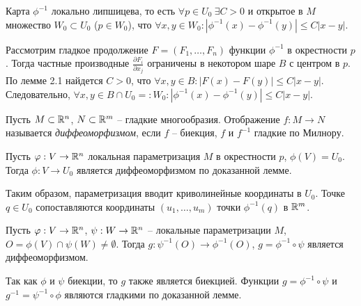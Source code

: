 \begin{corollary}
	Карта $\phi^{-1}$ локально липшицева, то есть 
	$\forall p \in U_0 \ \exists C > 0$ и открытое в $M$ множество $W_0 \subset U_0$ ($p \in W_0$), что $\forall x, y \in W_0 : |\phi^{-1}(x) - \phi^{-1}(y)| \leq C |x-y|$. 
\end{corollary}

\begin{myproof}
	Рассмотрим гладкое продолжение $F = (F_1, \dotsc, F_n)$ функции $\phi^{-1}$ в окрестности $p$. 
	Тогда частные производные $\frac{\partial F_i}{\partial x_j}$ ограничены в некотором шаре $B$ с центром в $p$. 
	По лемме 2.1 найдется $C > 0$, что $\forall x, y \in B : |F(x) - F(y)| \leq C |x-y|$. 
	Следовательно, $\forall x, y \in B \cap U_0 =: W_0 : |\phi^{-1}(x) - \phi^{-1}(y)| \leq C |x-y|$.
\end{myproof}

\begin{definition}
	Пусть $M \subset \mathbb{R}^n$, $N \subset \mathbb{R}^m$ -- гладкие многообразия. 
	Отображение $f: M \to N$ называется \textit{диффеоморфизмом}, если $f$ -- биекция, $f$ и $f^{-1}$ гладкие по Милнору.
\end{definition}

\begin{corollary}
	Пусть $\varphi : V \to \mathbb{R}^n$ локальная параметризация $M$ в окрестности $p$, $\phi(V) = U_0$.
	Тогда $\phi : V \to U_0$ является диффеоморфизмом по доказанной лемме. 
\end{corollary}

\begin{note}
	Таким образом, параметризация вводит криволинейные координаты в $U_0$. 
	Точке $q \in U_0$ сопоставляются координаты $(u_1, \dotsc, u_m)$ точки $\phi^{-1}(q)$ в $\mathbb{R}^m$.
\end{note}

\begin{corollary}
	Пусть $\varphi: V \to \mathbb{R}^n$, $\psi : W \to \mathbb{R}^n$ -- локальные параметризации $M$, $O = \phi(V) \cap \psi(W) \neq \emptyset$. 
	Тогда $g : \psi^{-1}(O) \to \phi^{-1}(O)$, $g = \phi^{-1} \circ \psi$ является диффеоморфизмом.
\end{corollary}

\begin{myproof}
	Так как $\phi$ и $\psi$ биекции, то $g$ также является биекцией. Функции $g = \phi^{-1} \circ \psi$ и $g^{-1} = \psi^{-1} \circ \phi$ являются гладкими по доказанной лемме.
\end{myproof}